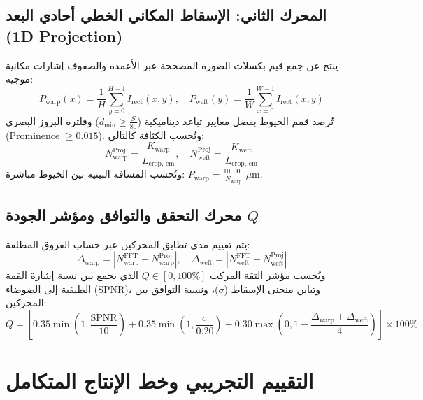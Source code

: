 \documentclass[11pt,a4paper]{article}
\begin{document}
\subsection{المحرك الثاني: الإسقاط المكاني الخطي أحادي البعد (1D Projection)}
ينتج عن جمع قيم بكسلات الصورة المصححة عبر الأعمدة والصفوف إشارات مكانية موجية:
\begin{equation}
    P_{\text{warp}}(x) = \frac{1}{H} \sum_{y=0}^{H-1} I_{\text{rect}}(x, y), \quad P_{\text{weft}}(y) = \frac{1}{W} \sum_{x=0}^{W-1} I_{\text{rect}}(x, y)
\end{equation}
تُرصد قمم الخيوط بفضل معايير تباعد ديناميكية ($d_{\min} \ge \frac{S}{80}$) وفلترة البروز البصري (Prominence $\ge 0.015$). وتُحسب الكثافة كالتالي:
\begin{equation}
    N_{\text{warp}}^{\text{Proj}} = \frac{K_{\text{warp}}}{L_{\text{crop, cm}}}, \quad N_{\text{weft}}^{\text{Proj}} = \frac{K_{\text{weft}}}{L_{\text{crop, cm}}}
\end{equation}
وتُحسب المسافة البينية بين الخيوط مباشرة: $P_{\text{warp}} = \frac{10,000}{N_{\text{warp}}}\,\mu\text{m}$.

\subsection{محرك التحقق والتوافق ومؤشر الجودة $Q$}
يتم تقييم مدى تطابق المحركين عبر حساب الفروق المطلقة:
\begin{equation}
    \Delta_{\text{warp}} = \left| N_{\text{warp}}^{\text{FFT}} - N_{\text{warp}}^{\text{Proj}} \right|, \quad \Delta_{\text{weft}} = \left| N_{\text{weft}}^{\text{FFT}} - N_{\text{weft}}^{\text{Proj}} \right|
\end{equation}
ويُحسب مؤشر الثقة المركب $Q \in [0, 100\%]$ الذي يجمع بين نسبة إشارة القمة الطيفية إلى الضوضاء (SPNR)، وتباين منحنى الإسقاط ($\sigma$)، ونسبة التوافق بين المحركين:
\begin{equation}
    Q = \left[ 0.35 \min\left(1, \frac{\text{SPNR}}{10}\right) + 0.35 \min\left(1, \frac{\sigma}{0.20}\right) + 0.30 \max\left(0, 1 - \frac{\Delta_{\text{warp}} + \Delta_{\text{weft}}}{4}\right) \right] \times 100\%
\end{equation}

\section{التقييم التجريبي وخط الإنتاج المتكامل}
\end{document}

